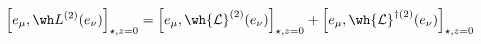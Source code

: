 \begin{equation}
\Big[e_\mu,\wh L^{(2)}(e_\nu) \Big]_{\star,z=0}  = 
\Big[e_\mu,\wh{\mathcal{L}}^{(2)}(e_\nu) \Big]_{\star,z=0} + 
\Big[e_\mu,\wh{\mathcal{L}}^{\dagger(2)}(e_\nu) \Big]_{\star,z=0}
\end{equation}

